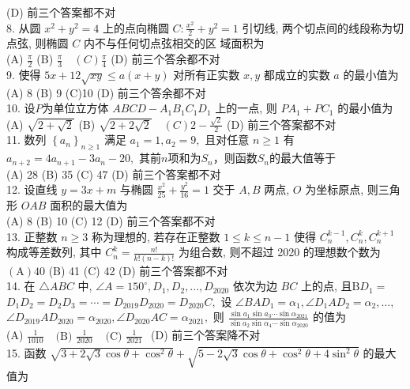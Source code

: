 (D) 前三个答案都不对\\
8. 从圆 $x^{2}+y^{2}=4$ 上的点向椭圆 $C: \frac{x^{2}}{2}+y^{2}=1$ 引切线, 两个切点间的线段称为切点弦, 则椭圆 $C$ 内不与任何切点弦相交的区 域面积为\\
(A) $\frac{\pi}{2}$
(B) $\frac{\pi}{3} \quad(C) \frac{\pi}{4}$
(D) 前三个答余都不对\\
9. 使得 $5x+12 \sqrt{xy}\leq a(x+y)$ 对所有正实数 $x,y$ 都成立的实数 $a$ 的最小值为\\
(A) 8
(B) 9
(C)10
(D) 前三个答余都不对\\
10. 设$P$为单位立方体 $A B C D-A_{1} B_{1} C_{1} D_{1}$ 上的一点, 则 $P A_{1}+P C_{1}$ 的最小值为\\
(A) $\sqrt{2+\sqrt{2}}$
(B) $\sqrt{2+2 \sqrt{2}} \quad(C) 2-\frac{\sqrt{2}}{2}$
(D) 前三个答案都不对\\
11. 数列 $\left\{a_{n}\right\}_{n \geq 1}$ 满足 $a_{1}=1, a_{2}=9,$ 且对任意 $n \geq 1$ 有 $a_{n+2}=4 a_{n+1}-3 a_{n}-20,$ 其前$n$项和为$S_{n}$，则函数$S_{n}$的最大值等于\\
(A) 28
(B) 35
(C) 47
(D) 前三个答案都不对\\
12. 设直线 $y=3 x+m$ 与椭圆 $\frac{x^{2}}{25}+\frac{y^{2}}{16}=1$ 交于 $A, B$ 两点, $O$ 为坐标原点, 则三角形 $O A B$ 面积的最大值为\\
(A) 8
(B) 10
(C) 12
(D) 前三个答案都不对\\
13. 正整数 $n \geq 3$ 称为理想的, 若存在正整数 $1 \leq k \leq n-1$ 使得 $C_{n}^{k-1}, C_{n}^{k}, C_{n}^{k+1}$ 构成等差数列, 其中 $C_{n}^{k}=\frac{n !}{k !(n-k) !}$ 为组合数, 则不超过 2020 的理想数个数为\\
$(\mathrm{A}) 40$
(B) 41
(C) 42
(D) 前三个答案都不对\\
14. 在 $\triangle A B C$ 中, $\angle A=150^{\circ}, D_{1}, D_{2}, \ldots, D_{2020}$ 依次为边 $B C$ 上的点, 且$\mathrm B D_{1}=$
$D_{1} D_{2}=D_{2} D_{3}=\cdots=D_{2019} D_{2020}=D_{2020} C,$ 设 $\angle B A D_{1}=\alpha_{1}, \angle D_{1} A D_{2}=\alpha_{2}, \ldots,$
$\angle D_{2019} A D_{2020}=\alpha_{2020}, \angle D_{2020} A C=\alpha_{2021},$ 则 $\frac{\sin a_{1} \sin a_{3} \cdots \sin \alpha_{2021}}{\sin a_{2} \sin \alpha_{4} \cdots \sin \alpha_{2020}}$ 的值为\\
(A) $\frac{1}{1010}$
$\begin{array}{ll}\text { (B) } \frac{1}{2020} & \text { (C) } \frac{1}{2021}\end{array}$
(D) 前三个答案降不对\\
15. 函数 $\sqrt{3+2 \sqrt{3} \cos \theta+\cos ^{2} \theta}+\sqrt{5-2 \sqrt{3} \cos \theta+\cos ^{2} \theta+4 \sin ^{2} \theta}$ 的最大值为\\
